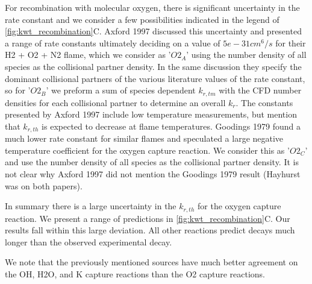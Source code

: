 For recombination with molecular oxygen, there is significant uncertainty in the rate constant and we consider a few possibilities indicated in the legend of \ref{fig:kwt_recombination}C. Axford 1997 discussed this uncertainty and presented a range of rate constants ultimately deciding on a value of $5e-31 cm^6/s$ for their H2 + O2 + N2 flame, which we consider as '$O2_A$' using the number density of all species as the collisional partner density. In the same discussion they specify the dominant collisional partners of the various literature values of the rate constant, so for '$O2_B$' we preform a sum of species dependent $k_{r,tm}$ with the CFD number densities for each collisional partner to determine an overall $k_r$. The constants presented by Axford 1997 include low temperature measurements, but mention that $k_{r,th}$ is expected to decrease at flame temperatures. Goodings 1979 found a much lower rate constant for similar flames and speculated a large negative temperature coefficient for the oxygen capture reaction. We consider this as '$O2_C$' and use the number density of all species as the collisional partner density. It is not clear why Axford 1997 did not mention the Goodings 1979 result (Hayhurst was on both papers). 

In summary there is a large uncertainty in the $k_{r,th}$ for the oxygen capture reaction. We present a range of predictions in \ref{fig:kwt_recombination}C. Our results fall within this large deviation. All other reactions predict decays much longer than the observed experimental decay. 

We note that the previously mentioned sources have much better agreement on the OH, H2O, and K capture reactions than the O2 capture reactions. 



